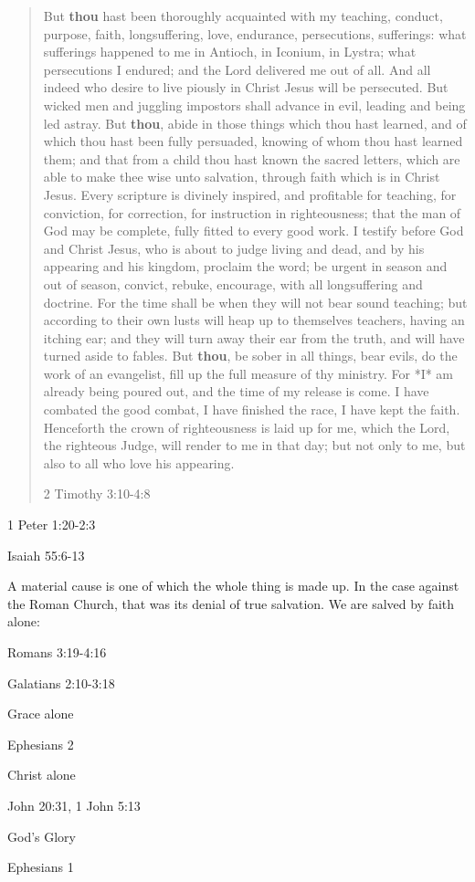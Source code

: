 \begin{quote}
But {\bf thou} hast been thoroughly acquainted with my teaching, conduct, purpose, faith, longsuffering, love, endurance, persecutions, sufferings: what sufferings happened to me in Antioch, in Iconium, in Lystra; what persecutions I endured; and the Lord delivered me out of all. And all indeed who desire to live piously in Christ Jesus will be persecuted. But wicked men and juggling impostors shall advance in evil, leading and being led astray. But {\bf thou}, abide in those things which thou hast learned, and of which thou hast been fully persuaded, knowing of whom thou hast learned them; and that from a child thou hast known the sacred letters, which are able to make thee wise unto salvation, through faith which is in Christ Jesus. Every scripture is divinely inspired, and profitable for teaching, for conviction, for correction, for instruction in righteousness; that the man of God may be complete, fully fitted to every good work. I testify before God and Christ Jesus, who is about to judge living and dead, and by his appearing and his kingdom, proclaim the word; be urgent in season and out of season, convict, rebuke, encourage, with all longsuffering and doctrine. For the time shall be when they will not bear sound teaching; but according to their own lusts will heap up to themselves teachers, having an itching ear; and they will turn away their ear from the truth, and will have turned aside to fables. But {\bf thou}, be sober in all things, bear evils, do the work of an evangelist, fill up the full measure of thy ministry. For *I* am already being poured out, and the time of my release is come. I have combated the good combat, I have finished the race, I have kept the faith. Henceforth the crown of righteousness is laid up for me, which the Lord, the righteous Judge, will render to me in that day; but not only to me, but also to all who love his appearing.
\begin{flushright} 2 Timothy 3:10-4:8 \end{flushright} \end{quote}

1 Peter 1:20-2:3

Isaiah 55:6-13

A material cause is one of which the whole thing is made up.  In the case against the Roman Church, that was its denial of true salvation.  We are salved by faith alone:

Romans 3:19-4:16

Galatians 2:10-3:18

Grace alone

Ephesians 2


Christ alone

John 20:31, 1 John 5:13

God's Glory

Ephesians 1